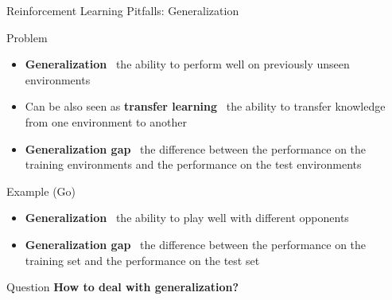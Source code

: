 \documentclass[presentation, 9pt]{beamer}\mode<presentation>{\usetheme{AMSBolognaFC}}
\begin{document}
\begin{frame}{Reinforcement Learning Pitfalls: Generalization}
\begin{block}{Problem}
	\begin{itemize}
		\item \textbf{Generalization} \faArrowRight \, the ability to perform well on previously unseen environments
		\item Can be also seen as \textbf{transfer learning} \faArrowRight \, the ability to transfer knowledge from one environment to another
		\item \textbf{Generalization gap} \faArrowRight \, the difference between the performance on the training environments and the performance on the test environments
	\end{itemize}
\end{block}
\begin{block}{Example (Go) \, \href{}{\faLink}}
	\begin{itemize}
		\item \textbf{Generalization} \faArrowRight \, the ability to play well with different opponents
		\item \textbf{Generalization gap} \faArrowRight \, the difference between the performance on the training set and the performance on the test set
	\end{itemize}
\end{block}
\begin{alertblock}{Question}
	\centering
	\textbf{How to deal with generalization?}
\end{alertblock}
\end{frame}
\end{document}
